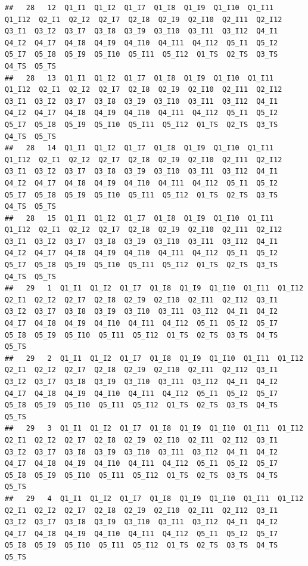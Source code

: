 \documentclass[]{book}
\begin{document}
\begin{verbatim}
##   28   12  Q1_I1  Q1_I2  Q1_I7  Q1_I8  Q1_I9  Q1_I10  Q1_I11  Q1_I12  Q2_I1  Q2_I2  Q2_I7  Q2_I8  Q2_I9  Q2_I10  Q2_I11  Q2_I12  Q3_I1  Q3_I2  Q3_I7  Q3_I8  Q3_I9  Q3_I10  Q3_I11  Q3_I12  Q4_I1  Q4_I2  Q4_I7  Q4_I8  Q4_I9  Q4_I10  Q4_I11  Q4_I12  Q5_I1  Q5_I2  Q5_I7  Q5_I8  Q5_I9  Q5_I10  Q5_I11  Q5_I12  Q1_TS  Q2_TS  Q3_TS  Q4_TS  Q5_TS
##   28   13  Q1_I1  Q1_I2  Q1_I7  Q1_I8  Q1_I9  Q1_I10  Q1_I11  Q1_I12  Q2_I1  Q2_I2  Q2_I7  Q2_I8  Q2_I9  Q2_I10  Q2_I11  Q2_I12  Q3_I1  Q3_I2  Q3_I7  Q3_I8  Q3_I9  Q3_I10  Q3_I11  Q3_I12  Q4_I1  Q4_I2  Q4_I7  Q4_I8  Q4_I9  Q4_I10  Q4_I11  Q4_I12  Q5_I1  Q5_I2  Q5_I7  Q5_I8  Q5_I9  Q5_I10  Q5_I11  Q5_I12  Q1_TS  Q2_TS  Q3_TS  Q4_TS  Q5_TS
##   28   14  Q1_I1  Q1_I2  Q1_I7  Q1_I8  Q1_I9  Q1_I10  Q1_I11  Q1_I12  Q2_I1  Q2_I2  Q2_I7  Q2_I8  Q2_I9  Q2_I10  Q2_I11  Q2_I12  Q3_I1  Q3_I2  Q3_I7  Q3_I8  Q3_I9  Q3_I10  Q3_I11  Q3_I12  Q4_I1  Q4_I2  Q4_I7  Q4_I8  Q4_I9  Q4_I10  Q4_I11  Q4_I12  Q5_I1  Q5_I2  Q5_I7  Q5_I8  Q5_I9  Q5_I10  Q5_I11  Q5_I12  Q1_TS  Q2_TS  Q3_TS  Q4_TS  Q5_TS
##   28   15  Q1_I1  Q1_I2  Q1_I7  Q1_I8  Q1_I9  Q1_I10  Q1_I11  Q1_I12  Q2_I1  Q2_I2  Q2_I7  Q2_I8  Q2_I9  Q2_I10  Q2_I11  Q2_I12  Q3_I1  Q3_I2  Q3_I7  Q3_I8  Q3_I9  Q3_I10  Q3_I11  Q3_I12  Q4_I1  Q4_I2  Q4_I7  Q4_I8  Q4_I9  Q4_I10  Q4_I11  Q4_I12  Q5_I1  Q5_I2  Q5_I7  Q5_I8  Q5_I9  Q5_I10  Q5_I11  Q5_I12  Q1_TS  Q2_TS  Q3_TS  Q4_TS  Q5_TS
##   29   1  Q1_I1  Q1_I2  Q1_I7  Q1_I8  Q1_I9  Q1_I10  Q1_I11  Q1_I12  Q2_I1  Q2_I2  Q2_I7  Q2_I8  Q2_I9  Q2_I10  Q2_I11  Q2_I12  Q3_I1  Q3_I2  Q3_I7  Q3_I8  Q3_I9  Q3_I10  Q3_I11  Q3_I12  Q4_I1  Q4_I2  Q4_I7  Q4_I8  Q4_I9  Q4_I10  Q4_I11  Q4_I12  Q5_I1  Q5_I2  Q5_I7  Q5_I8  Q5_I9  Q5_I10  Q5_I11  Q5_I12  Q1_TS  Q2_TS  Q3_TS  Q4_TS  Q5_TS
##   29   2  Q1_I1  Q1_I2  Q1_I7  Q1_I8  Q1_I9  Q1_I10  Q1_I11  Q1_I12  Q2_I1  Q2_I2  Q2_I7  Q2_I8  Q2_I9  Q2_I10  Q2_I11  Q2_I12  Q3_I1  Q3_I2  Q3_I7  Q3_I8  Q3_I9  Q3_I10  Q3_I11  Q3_I12  Q4_I1  Q4_I2  Q4_I7  Q4_I8  Q4_I9  Q4_I10  Q4_I11  Q4_I12  Q5_I1  Q5_I2  Q5_I7  Q5_I8  Q5_I9  Q5_I10  Q5_I11  Q5_I12  Q1_TS  Q2_TS  Q3_TS  Q4_TS  Q5_TS
##   29   3  Q1_I1  Q1_I2  Q1_I7  Q1_I8  Q1_I9  Q1_I10  Q1_I11  Q1_I12  Q2_I1  Q2_I2  Q2_I7  Q2_I8  Q2_I9  Q2_I10  Q2_I11  Q2_I12  Q3_I1  Q3_I2  Q3_I7  Q3_I8  Q3_I9  Q3_I10  Q3_I11  Q3_I12  Q4_I1  Q4_I2  Q4_I7  Q4_I8  Q4_I9  Q4_I10  Q4_I11  Q4_I12  Q5_I1  Q5_I2  Q5_I7  Q5_I8  Q5_I9  Q5_I10  Q5_I11  Q5_I12  Q1_TS  Q2_TS  Q3_TS  Q4_TS  Q5_TS
##   29   4  Q1_I1  Q1_I2  Q1_I7  Q1_I8  Q1_I9  Q1_I10  Q1_I11  Q1_I12  Q2_I1  Q2_I2  Q2_I7  Q2_I8  Q2_I9  Q2_I10  Q2_I11  Q2_I12  Q3_I1  Q3_I2  Q3_I7  Q3_I8  Q3_I9  Q3_I10  Q3_I11  Q3_I12  Q4_I1  Q4_I2  Q4_I7  Q4_I8  Q4_I9  Q4_I10  Q4_I11  Q4_I12  Q5_I1  Q5_I2  Q5_I7  Q5_I8  Q5_I9  Q5_I10  Q5_I11  Q5_I12  Q1_TS  Q2_TS  Q3_TS  Q4_TS  Q5_TS

\end{verbatim}
\end{document}
